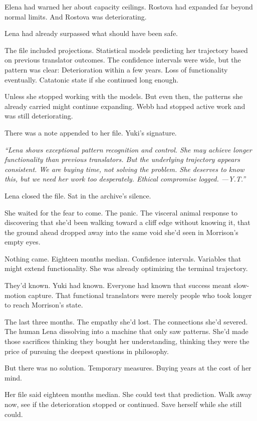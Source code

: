 Elena had warned her about capacity ceilings. Rostova had expanded far beyond normal limits. And Rostova was deteriorating.

Lena had already surpassed what should have been safe.

The file included projections. Statistical models predicting her trajectory based on previous translator outcomes. The confidence intervals were wide, but the pattern was clear: Deterioration within a few years. Loss of functionality eventually. Catatonic state if she continued long enough.

Unless she stopped working with the models. But even then, the patterns she already carried might continue expanding. Webb had stopped active work and was still deteriorating.

There was a note appended to her file. Yuki's signature.

\textit{``Lena shows exceptional pattern recognition and control. She may achieve longer functionality than previous translators. But the underlying trajectory appears consistent. We are buying time, not solving the problem. She deserves to know this, but we need her work too desperately. Ethical compromise logged. —Y.T.''}

Lena closed the file. Sat in the archive's silence.

She waited for the fear to come. The panic. The visceral animal response to discovering that she'd been walking toward a cliff edge without knowing it, that the ground ahead dropped away into the same void she'd seen in Morrison's empty eyes.

Nothing came. Eighteen months median. Confidence intervals. Variables that might extend functionality. She was already optimizing the terminal trajectory.

They'd known. Yuki had known. Everyone had known that success meant slow-motion capture. That functional translators were merely people who took longer to reach Morrison's state.

The last three months. The empathy she'd lost. The connections she'd severed. The human Lena dissolving into a machine that only saw patterns. She'd made those sacrifices thinking they bought her understanding, thinking they were the price of pursuing the deepest questions in philosophy.

But there was no solution. Temporary measures. Buying years at the cost of her mind.

Her file said eighteen months median. She could test that prediction. Walk away now, see if the deterioration stopped or continued. Save herself while she still could.


